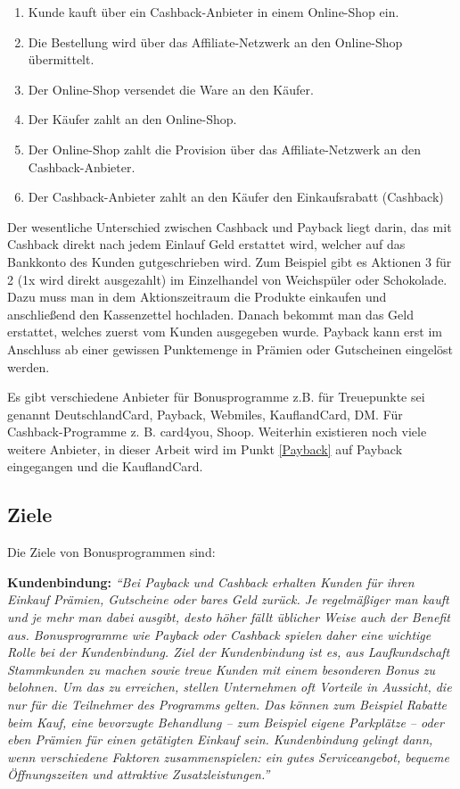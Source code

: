 \begin{enumerate}
	\item Kunde kauft über ein Cashback-Anbieter in einem Online-Shop ein.
	\item Die Bestellung wird über das Affiliate-Netzwerk an den Online-Shop übermittelt.
	\item Der Online-Shop versendet die Ware an den Käufer.
	\item Der Käufer zahlt an den Online-Shop.
	\item Der Online-Shop zahlt die Provision über das Affiliate-Netzwerk an den Cashback-Anbieter.
	\item Der Cashback-Anbieter zahlt an den Käufer den Einkaufsrabatt (Cashback) \cite{Bonus_affiliate}
\end{enumerate}

\noindent Der wesentliche Unterschied zwischen Cashback und Payback liegt darin, das mit Cashback direkt nach jedem Einlauf Geld erstattet wird, welcher auf das Bankkonto des Kunden gutgeschrieben wird. Zum Beispiel gibt es Aktionen 3 für 2 (1x wird direkt ausgezahlt) im Einzelhandel von Weichspüler oder Schokolade. Dazu muss man in dem Aktionszeitraum die Produkte einkaufen und anschließend den Kassenzettel hochladen. Danach bekommt man das Geld erstattet, welches zuerst vom Kunden ausgegeben wurde. Payback kann erst im Anschluss ab einer gewissen Punktemenge in Prämien oder Gutscheinen eingelöst werden. \cite{TreueCash} \newline

\noindent Es gibt verschiedene Anbieter für Bonusprogramme z.B. für Treuepunkte sei genannt DeutschlandCard, Payback, Webmiles, KauflandCard, DM. Für Cashback-Programme z. B. card4you, Shoop. Weiterhin existieren noch viele weitere Anbieter, in dieser Arbeit wird im Punkt \ref{Payback} auf Payback eingegangen und die KauflandCard.

\subsection {Ziele}
Die Ziele von Bonusprogrammen sind: \newline

\noindent \textbf{Kundenbindung:} \textit{``Bei Payback und Cashback erhalten Kunden für ihren Einkauf Prämien, Gutscheine oder bares Geld zurück. Je regelmäßiger man kauft und je mehr man dabei ausgibt, desto höher fällt üblicher Weise auch der Benefit aus. Bonusprogramme wie Payback oder Cashback spielen daher eine wichtige Rolle bei der Kundenbindung. Ziel der Kundenbindung ist es, aus Laufkundschaft Stammkunden zu machen sowie treue Kunden mit einem besonderen Bonus zu belohnen. Um das zu erreichen, stellen Unternehmen oft Vorteile in Aussicht, die nur für die Teilnehmer des Programms gelten. Das können zum Beispiel Rabatte beim Kauf, eine bevorzugte Behandlung – zum Beispiel eigene Parkplätze – oder eben Prämien für einen getätigten Einkauf sein. Kundenbindung gelingt dann, wenn verschiedene Faktoren zusammenspielen: ein gutes Serviceangebot, bequeme Öffnungszeiten und attraktive Zusatzleistungen.'' \cite{paycashback_all}} \newline

